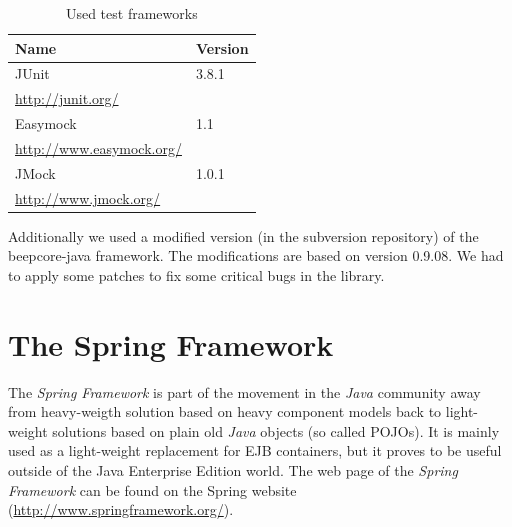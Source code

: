 \begin{table}[H]
 \centering
 \begin{tabular}{|l|l|}
  \hline
   \multicolumn{1}{|p{4.5in}|}{\bfseries{\textsf{Name}}} &
   \multicolumn{1}{|p{0.6in}|}{\bfseries{\textsf{Version}}} \\
  \hline
   \multicolumn{1}{|p{4.5in}|}{JUnit} &
   \multicolumn{1}{|p{0.6in}|}{3.8.1} \\
   \multicolumn{1}{|p{4.5in}|}{\footnotesize{\href{http://junit.org/}{http://junit.org/}}} &
   \multicolumn{1}{|p{0.6in}|}{} \\

  \hline
   \multicolumn{1}{|p{4.5in}|}{Easymock} &
   \multicolumn{1}{|p{0.6in}|}{1.1} \\
   \multicolumn{1}{|p{4.5in}|}{\footnotesize{\href{http://www.easymock.org/}{http://www.easymock.org/}}} &
   \multicolumn{1}{|p{0.6in}|}{} \\

  \hline
   \multicolumn{1}{|p{4.5in}|}{JMock} &
   \multicolumn{1}{|p{0.6in}|}{1.0.1} \\
   \multicolumn{1}{|p{4.5in}|}{\footnotesize{\href{http://www.jmock.org/}{http://www.jmock.org/}}} &
   \multicolumn{1}{|p{0.6in}|}{} \\

  \hline
 \end{tabular}
 \caption{Used test frameworks}
\end{table}

Additionally we used a modified version (in the subversion repository) of the
beepcore-java framework. The modifications are based on version 0.9.08. We
had to apply some patches to fix some critical bugs in the library.


\section{The Spring Framework}
\label{appendix_frameworks_spring}

The \emph{Spring Framework} is part of the movement in the \emph{Java}
community away from heavy-weigth solution based on heavy component models
back to light-weight solutions based on plain old \emph{Java} objects
(so called POJOs). It
is mainly used as a light-weight replacement for EJB containers, but it
proves to be useful outside of the Java Enterprise Edition world. The 
web page of the \emph{Spring Framework} can be found on the Spring website
(\href{http://www.springframework.org/}{http://www.springframework.org/}).


